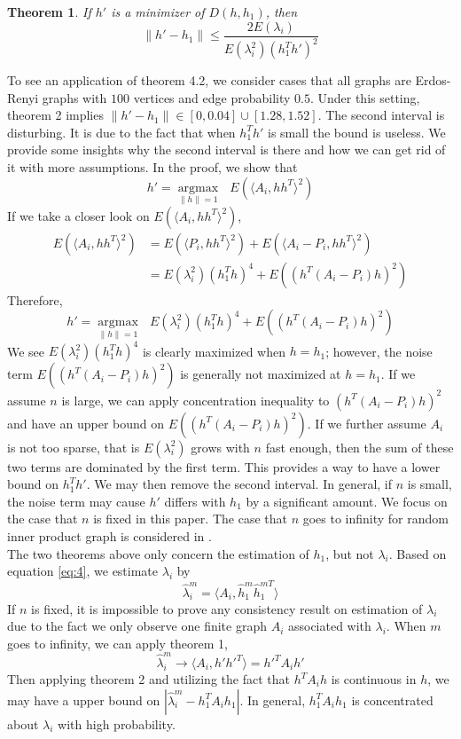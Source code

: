 \documentclass[10pt,journal,compsoc]{IEEEtran}
\newtheorem{theorem}{Theorem}[section]
\begin{document}
\begin{theorem}
	If $h'$ is a minimizer of $D(h,h_1)$, then 
	\[\|h'-h_1\| \leq \frac{2 E(\lambda_i)}{E(\lambda_i^2)(h_1^T h')^2} \]
\end{theorem}

\noindent	To see an application of theorem 4.2, we consider cases that all graphs are Erdos-Renyi graphs with $100$ vertices and edge probability $0.5$. Under this setting, theorem 2 implies  $\|h'-h_1\| \in [0,0.04] \cup [1.28,1.52]$. The second interval is disturbing. It is due to the fact that when $h_1^T h'$ is small the bound is useless. We provide some insights why the second interval is there and how we can get rid of it with more assumptions. In the proof, we show that
\[h'= \underset{\|h\| =1}{\operatorname{argmax}} \text{ } E(\langle A_i,h h^T \rangle ^2) \]
If we take a closer look on $E(\langle A_i,h h^T \rangle ^2)$,
\begin{align*}
	E(\langle A_i,h h^T \rangle ^2) &= E(\langle P_i,h h^T \rangle ^2)+E(\langle A_i-P_i,h h^T \rangle ^2) \\
	&=E(\lambda_i^2)(h_1^T h)^4+E((h^T (A_i-P_i)h) ^2)
\end{align*}
Therefore, 
\[h'= \underset{\|h\| =1}{\operatorname{argmax}} \text{ } E(\lambda_i^2)(h_1^T h)^4+E((h^T (A_i-P_i)h) ^2) \]
We see $E(\lambda_i^2)(h_1^T h)^4$ is clearly maximized when $h=h_1$; however, the noise term $E((h^T (A_i-P_i)h) ^2)$ is generally not maximized at $h=h_1$. If we assume $n$ is large, we can apply concentration inequality to $(h^T (A_i-P_i)h) ^2$ and have an upper bound on $E((h^T (A_i-P_i)h) ^2)$. If we further assume $A_i$ is not too sparse, that is $E(\lambda_i^2)$ grows with $n$ fast enough, then the sum of these two terms are dominated by the first term. This provides a way to have a lower bound on $h_1^T h'$. We may then remove the second interval. In general, if $n$ is small, the noise term may cause $h'$ differs with $h_1$ by a significant amount. We focus on the case that $n$ is fixed in this paper. The case that $n$ goes to infinity for random inner product graph is considered in \cite{athreya2013limit}.\\


\noindent The two theorems above only concern the estimation of $h_1$, but not $\lambda_i$. Based on equation \eqref{eq:4}, we estimate $\lambda_i$ by
\[\hat{\lambda}_i^m= \langle A_i,\hat{h}_1^m \hat{h}_1^{m T} \rangle \]If $n$ is fixed, it is impossible to prove any consistency result on estimation of $\lambda_i$ due to the fact we only observe one finite graph $A_i$ associated with $\lambda_i$. When $m$ goes to infinity, we can apply theorem 1,
\[\hat{\lambda}_i^m \rightarrow \langle A_i,h' h'^T \rangle = h'^T A_i h'\]
Then applying theorem 2 and utilizing the fact that $h^T A_i h$ is continuous in $h$, we may have a upper bound on $|\hat{\lambda}_i^m - h_1^T A_i h_1|$. In general, $h_1^T A_i h_1$ is concentrated about $\lambda_i$ with high probability. 
\end{document}
